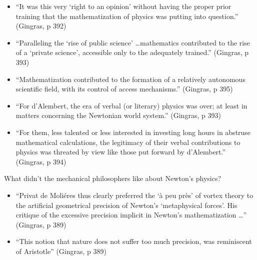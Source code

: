 \documentclass[fleqn]{beamer}
\begin{document}
\begin{frame}

  \begin{itemize}
  \item ``It was this very `right to an opinion' without having the
    proper prior training that the mathematization of physics was
    putting into question.'' (Gingras, p 392)
  \item ``Paralleling the `rise of public science' \dots mathematics
    contributed to the rise of a `private science', accessible only to
    the adequately trained.'' (Gingras, p 393)
  \item ``Mathematization contributed to the formation of a relatively
    autonomous scientific field, with its control of access
    mechanisms.'' (Gingras, p 395)
  \end{itemize}
 
\end{frame}

\begin{frame}

  \begin{itemize}
  \item ``For d'Alembert, the era of verbal (or literary) physics was
    over; at least in matters concerning the Newtonian world system.''
    (Gingras, p 393)
  \item ``For them, less talented or less interested in investing long
    hours in abstruse mathematical calculations, the legitimacy of
    their verbal contributions to physics was threated by view like
    those put forward by d'Alembert.'' (Gingras, p 394)
  \end{itemize}

\end{frame}

\begin{frame}{What didn't the mechanical philosophers like about
    Newton's physics?}

  \begin{itemize}
  \item ``Privat de Moli{\'e}res thus clearly preferred the `\`a peu
    pr\`es' of vortex theory to the artificial geometrical precision
    of Newton's `metaphysical forces'. His critique of the excessive
    precision implicit in Newton's mathematization \dots '' (Gingras,
    p 389)
  \item ``This notion that nature does not suffer too much precision,
    was reminiscent of Aristotle'' (Gingras, p 389)
  \end{itemize}



\end{frame}
\end{document}
